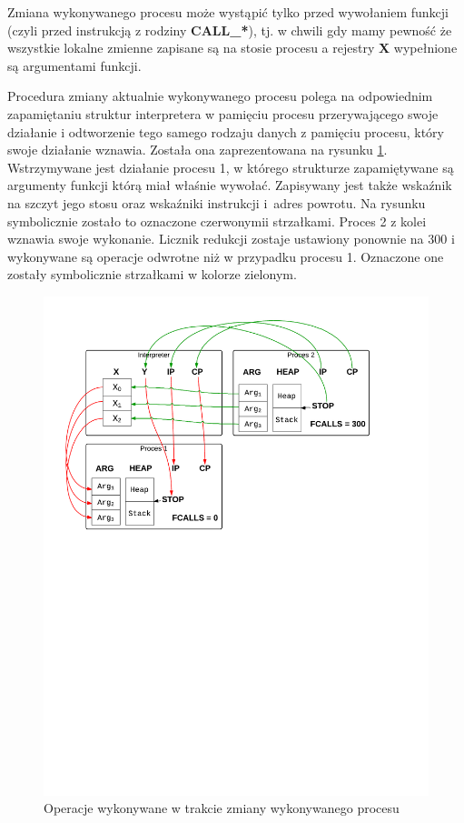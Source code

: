 Zmiana wykonywanego procesu może wystąpić tylko przed wywołaniem funkcji (czyli przed instrukcją z rodziny \textbf{CALL\_*}), tj. w chwili gdy mamy pewność że wszystkie lokalne zmienne zapisane są na stosie procesu a rejestry \textbf{X} wypełnione są argumentami funkcji.

Procedura zmiany aktualnie wykonywanego procesu polega na odpowiednim zapamiętaniu struktur interpretera w pamięciu procesu przerywającego swoje działanie i odtworzenie tego samego rodzaju danych z pamięciu procesu, który swoje działanie wznawia.
Została ona zaprezentowana na rysunku \ref{fig:preemption}.
Wstrzymywane jest działanie procesu 1, w którego strukturze zapamiętywane są argumenty funkcji którą miał właśnie wywołać.
Zapisywany jest także wskaźnik na szczyt jego stosu oraz wskaźniki instrukcji i~adres powrotu. Na rysunku symbolicznie zostało to oznaczone czerwonymii strzałkami.
Proces 2 z kolei wznawia swoje wykonanie. Licznik redukcji zostaje ustawiony ponownie na 300 i wykonywane są operacje odwrotne niż w przypadku procesu 1.
Oznaczone one zostały symbolicznie strzałkami w kolorze zielonym.

\begin{figure}[h]
\centerline{\includegraphics[scale=0.8, clip, trim=10mm 145mm 30mm 10mm]{preemption}}
\caption{Operacje wykonywane w trakcie zmiany wykonywanego procesu}
\label{fig:preemption}
\end{figure}

